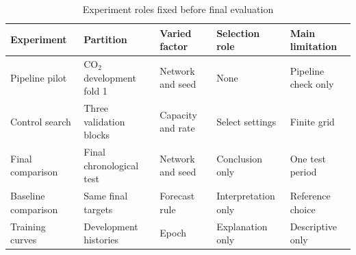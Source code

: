 \begin{table}[t]
\caption{Experiment roles fixed before final evaluation}
\label{tab:experiments}
\centering\footnotesize
\begin{tabular}{lllll}
\toprule
Experiment & Partition & Varied factor & Selection role & Main limitation \\
\midrule
Pipeline pilot & CO$_2$ development fold 1 & Network and seed & None & Pipeline check only \\
Control search & Three validation blocks & Capacity and rate & Select settings & Finite grid \\
Final comparison & Final chronological test & Network and seed & Conclusion only & One test period \\
Baseline comparison & Same final targets & Forecast rule & Interpretation only & Reference choice \\
Training curves & Development histories & Epoch & Explanation only & Descriptive only \\
\bottomrule
\end{tabular}
\end{table}

